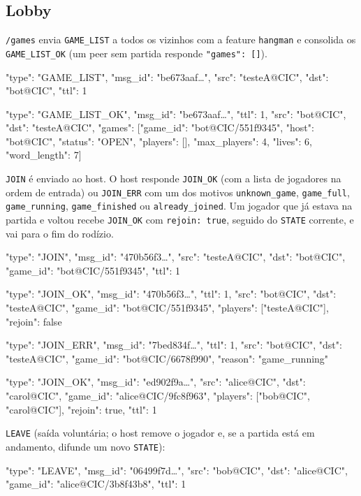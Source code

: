 \documentclass[11pt,a4paper]{article}
\begin{document}
\subsection{Lobby}
\texttt{/games} envia \texttt{GAME\_LIST} a todos os vizinhos com a feature \texttt{hangman} e consolida os \texttt{GAME\_LIST\_OK} (um peer sem partida responde \texttt{"games": []}).
\begin{codigo}
{
  "type": "GAME_LIST",
  "msg_id": "be673aaf…",
  "src": "testeA@CIC",
  "dst": "bot@CIC",
  "ttl": 1
}
\end{codigo}
\begin{codigo}
{
  "type": "GAME_LIST_OK",
  "msg_id": "be673aaf…",
  "ttl": 1,
  "src": "bot@CIC",
  "dst": "testeA@CIC",
  "games": [{"game_id": "bot@CIC/551f9345", "host": "bot@CIC", "status": "OPEN", "players": [],
      "max_players": 4, "lives": 6, "word_length": 7}]
}
\end{codigo}
\texttt{JOIN} é enviado ao host. O host responde \texttt{JOIN\_OK} (com a lista de jogadores na ordem de entrada) ou \texttt{JOIN\_ERR} com um dos motivos \texttt{unknown\_game}, \texttt{game\_full}, \texttt{game\_running}, \texttt{game\_finished} ou \texttt{already\_joined}. Um jogador que já estava na partida e voltou recebe \texttt{JOIN\_OK} com \texttt{rejoin: true}, seguido do \texttt{STATE} corrente, e vai para o fim do rodízio.
\begin{codigo}
{
  "type": "JOIN",
  "msg_id": "470b56f3…",
  "src": "testeA@CIC",
  "dst": "bot@CIC",
  "game_id": "bot@CIC/551f9345",
  "ttl": 1
}
\end{codigo}
\begin{codigo}
{
  "type": "JOIN_OK",
  "msg_id": "470b56f3…",
  "ttl": 1,
  "src": "bot@CIC",
  "dst": "testeA@CIC",
  "game_id": "bot@CIC/551f9345",
  "players": ["testeA@CIC"],
  "rejoin": false
}
\end{codigo}
\begin{codigo}
{
  "type": "JOIN_ERR",
  "msg_id": "7bed834f…",
  "ttl": 1,
  "src": "bot@CIC",
  "dst": "testeA@CIC",
  "game_id": "bot@CIC/6678f990",
  "reason": "game_running"
}
\end{codigo}
\begin{codigo}
{
  "type": "JOIN_OK",
  "msg_id": "ed902f9a…",
  "src": "alice@CIC",
  "dst": "carol@CIC",
  "game_id": "alice@CIC/9fc8f963",
  "players": ["bob@CIC", "carol@CIC"],
  "rejoin": true,
  "ttl": 1
}
\end{codigo}
\texttt{LEAVE} (saída voluntária; o host remove o jogador e, se a partida está em andamento, difunde um novo \texttt{STATE}):
\begin{codigo}
{
  "type": "LEAVE",
  "msg_id": "06499f7d…",
  "src": "bob@CIC",
  "dst": "alice@CIC",
  "game_id": "alice@CIC/3b8f43b8",
  "ttl": 1
}
\end{codigo}
\end{document}
